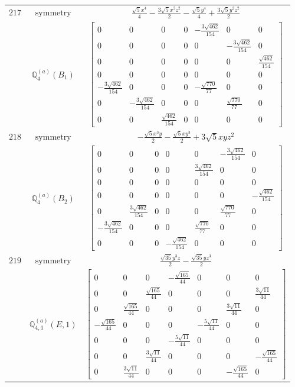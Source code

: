 \documentclass[fleqn,8pt,landscape]{jsarticle}
\begin{document}
\begin{longtable}{ccc}
$ 217 $ & $ \text{symmetry} $ & $ \frac{\sqrt{5} x^{4}}{4} - \frac{3 \sqrt{5} x^{2} z^{2}}{2} - \frac{\sqrt{5} y^{4}}{4} + \frac{3 \sqrt{5} y^{2} z^{2}}{2} $ \\
$  $ & $ \mathbb{Q}_{4}^{(a)}(B_{1}) $ & $ \begin{bmatrix} 0 & 0 & 0 & 0 & - \frac{3 \sqrt{462}}{154} & 0 & 0 \\ 0 & 0 & 0 & 0 & 0 & - \frac{3 \sqrt{462}}{154} & 0 \\ 0 & 0 & 0 & 0 & 0 & 0 & \frac{\sqrt{462}}{154} \\ 0 & 0 & 0 & 0 & 0 & 0 & 0 \\ - \frac{3 \sqrt{462}}{154} & 0 & 0 & 0 & - \frac{\sqrt{770}}{77} & 0 & 0 \\ 0 & - \frac{3 \sqrt{462}}{154} & 0 & 0 & 0 & \frac{\sqrt{770}}{77} & 0 \\ 0 & 0 & \frac{\sqrt{462}}{154} & 0 & 0 & 0 & 0 \end{bmatrix} $ \\ \hline
$ 218 $ & $ \text{symmetry} $ & $ - \frac{\sqrt{5} x^{3} y}{2} - \frac{\sqrt{5} x y^{3}}{2} + 3 \sqrt{5} x y z^{2} $ \\
$  $ & $ \mathbb{Q}_{4}^{(a)}(B_{2}) $ & $ \begin{bmatrix} 0 & 0 & 0 & 0 & 0 & - \frac{3 \sqrt{462}}{154} & 0 \\ 0 & 0 & 0 & 0 & \frac{3 \sqrt{462}}{154} & 0 & 0 \\ 0 & 0 & 0 & 0 & 0 & 0 & 0 \\ 0 & 0 & 0 & 0 & 0 & 0 & - \frac{\sqrt{462}}{154} \\ 0 & \frac{3 \sqrt{462}}{154} & 0 & 0 & 0 & \frac{\sqrt{770}}{77} & 0 \\ - \frac{3 \sqrt{462}}{154} & 0 & 0 & 0 & \frac{\sqrt{770}}{77} & 0 & 0 \\ 0 & 0 & 0 & - \frac{\sqrt{462}}{154} & 0 & 0 & 0 \end{bmatrix} $ \\ \hline
$ 219 $ & $ \text{symmetry} $ & $ \frac{\sqrt{35} y^{3} z}{2} - \frac{\sqrt{35} y z^{3}}{2} $ \\
$  $ & $ \mathbb{Q}_{4,1}^{(a)}(E,1) $ & $ \begin{bmatrix} 0 & 0 & 0 & - \frac{\sqrt{165}}{44} & 0 & 0 & 0 \\ 0 & 0 & \frac{\sqrt{165}}{44} & 0 & 0 & 0 & \frac{3 \sqrt{11}}{44} \\ 0 & \frac{\sqrt{165}}{44} & 0 & 0 & 0 & \frac{3 \sqrt{11}}{44} & 0 \\ - \frac{\sqrt{165}}{44} & 0 & 0 & 0 & - \frac{5 \sqrt{11}}{44} & 0 & 0 \\ 0 & 0 & 0 & - \frac{5 \sqrt{11}}{44} & 0 & 0 & 0 \\ 0 & 0 & \frac{3 \sqrt{11}}{44} & 0 & 0 & 0 & - \frac{\sqrt{165}}{44} \\ 0 & \frac{3 \sqrt{11}}{44} & 0 & 0 & 0 & - \frac{\sqrt{165}}{44} & 0 \end{bmatrix} $ \\ \hline

\end{longtable}
\end{document}
